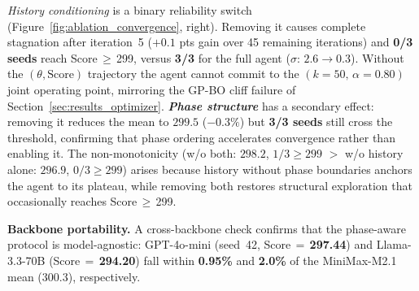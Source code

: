\documentclass[sigconf, nonacm]{acmart}
\theoremstyle{definition}
\begin{document}
\emph{History conditioning} is a binary reliability switch (Figure~\ref{fig:ablation_convergence}, right).
Removing it causes complete stagnation after iteration~5 ($+0.1$ pts gain over 45 remaining iterations)
and \textbf{0/3 seeds} reach Score\,$\geq$\,299, versus \textbf{3/3} for the full agent ($\sigma$: $2.6\to0.3$).
Without the $(\theta,\mathrm{Score})$ trajectory the agent cannot commit to the $(k{=}50,\,\alpha{=}0.80)$
joint operating point, mirroring the GP-BO cliff failure of Section~\ref{sec:results_optimizer}.
\emph{\textbf{Phase structure}} has a secondary effect: removing it reduces the mean to $299.5$ ($-0.3\%$) but \textbf{3/3 seeds}
still cross the threshold, confirming that phase ordering accelerates convergence rather than enabling it.
The non-monotonicity (w/o both: \textbf{$298.2$}, $1/3{\geq}299$ $>$ w/o history alone: \textbf{$296.9$}, $0/3{\geq}299$)
arises because history without phase boundaries anchors the agent to its plateau, while removing both
restores structural exploration that occasionally reaches Score\,$\geq$\,299.

\begingroup
\small
\setlength{\tabcolsep}{4pt}
\label{tab:ablation_arch}
\endgroup
\vspace{4pt}

\noindent\textbf{Backbone portability.}
A cross-backbone check confirms that the phase-aware protocol is model-agnostic:
GPT-4o-mini (seed~42, Score\,$=$\,\textbf{297.44}) and Llama-3.3-70B (Score\,$=$\,\textbf{294.20}) fall within
\textbf{0.95\%} and \textbf{2.0\%} of the MiniMax-M2.1 mean ($300.3$), respectively.
\end{document}
